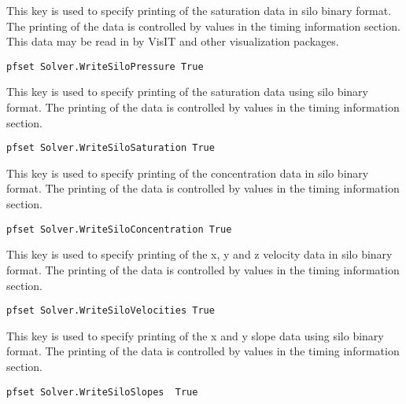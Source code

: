 {
This key is used to specify printing of the saturation data in silo binary format.
The printing of the data is controlled by values in the
timing information section. This data may be read in by VisIT and other visualization packages.
}
\begin{display}\begin{verbatim}
pfset Solver.WriteSiloPressure True
\end{verbatim}\end{display}

{
This key is used to specify printing of the saturation data using silo binary format.
The printing of the data is controlled by values in the
timing information section.
}
\begin{display}\begin{verbatim}
pfset Solver.WriteSiloSaturation True
\end{verbatim}\end{display}

{
This key is used to specify printing of the concentration data in silo binary format.
The printing of the data is controlled by values in the
timing information section.
}
\begin{display}\begin{verbatim}
pfset Solver.WriteSiloConcentration True
\end{verbatim}\end{display}

{
This key is used to specify printing of the x, y and z
velocity data in silo binary format.  The printing of the data is controlled by
values in the timing information section.
}
\begin{display}\begin{verbatim}
pfset Solver.WriteSiloVelocities True
\end{verbatim}\end{display}

{
This key is used to specify printing of the x and y slope data using silo binary format.
The printing of the data is controlled by values in the
timing information section.
}
\begin{display}\begin{verbatim}
pfset Solver.WriteSiloSlopes  True
\end{verbatim}\end{display}

